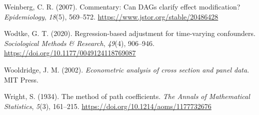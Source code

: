 \documentclass[
  11pt,
  a4paper,
]{article}
\newlength{\cslhangindent}
\newenvironment{CSLReferences}[2] %
 {\begin{list}{}{%
  \setlength{\itemindent}{0pt}
  \setlength{\leftmargin}{0pt}
  \setlength{\parsep}{0pt}
  \ifodd #1
   \setlength{\leftmargin}{\cslhangindent}
   \setlength{\itemindent}{-1\cslhangindent}
  \fi
  \setlength{\itemsep}{#2\baselineskip}}}
 {\end{list}}
\begin{document}
\begin{CSLReferences}{1}{0}
Weinberg, C. R. (2007). Commentary: Can DAGs clarify effect
modification? \emph{Epidemiology}, \emph{18}(5), 569--572.
\url{https://www.jstor.org/stable/20486428}

Wodtke, G. T. (2020). Regression-based adjustment for time-varying
confounders. \emph{Sociological Methods \& Research}, \emph{49}(4),
906--946. \url{https://doi.org/10.1177/0049124118769087}

Wooldridge, J. M. (2002). \emph{Econometric analysis of cross section
and panel data}. MIT Press.

Wright, S. (1934). The method of path coefficients. \emph{The Annals of
Mathematical Statistics}, \emph{5}(3), 161--215.
\url{https://doi.org/10.1214/aoms/1177732676}

\end{CSLReferences}
\end{document}
